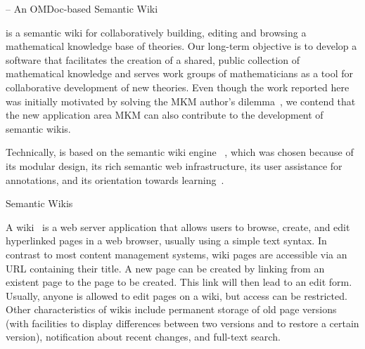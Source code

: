 
\begin{omgroup}[id=swim,creators={clange,miko}]{{\swim} -- An OMDoc-based Semantic Wiki}

{\swim} is a semantic wiki for collaboratively building, editing and browsing a
mathematical knowledge base of {\omdoc} theories. Our long-term objective is to develop a
software that facilitates the creation of a shared, public collection of mathematical
knowledge and serves work groups of mathematicians as a tool for collaborative development
of new theories.  Even though the work reported here was initially motivated by solving
the MKM author's dilemma~\cite{KohKoh:cdad04}, we contend that the new application area
MKM can also contribute to the development of semantic wikis.

Technically, {\swim} is based on the semantic wiki engine
~\cite{schaffert06:ikewiki}, which was chosen because of its
modular design, its rich semantic web infrastructure, its user assistance for
annotations, and its orientation towards
learning~\cite{schaffert06:learning-with-semantic-wikis}.

\begin{omgroup}{Semantic Wikis}

A wiki~\cite{LeuCun01:wikiway} is a web server
application that allows users to browse, create, and edit hyperlinked pages in a web
browser, usually using a simple text syntax.  In contrast to most content management
systems, wiki pages are accessible via an URL containing their title.  A new page can be
created by linking from an existent page to the page to be created.  This link will then
lead to an edit form.  Usually, anyone is allowed to edit pages on a wiki, but access can
be restricted.  Other characteristics of wikis include permanent storage of old page
versions (with facilities to display differences between two versions and to restore a
certain version), notification about recent changes, and full-text search.


\end{omgroup}
\end{omgroup}
